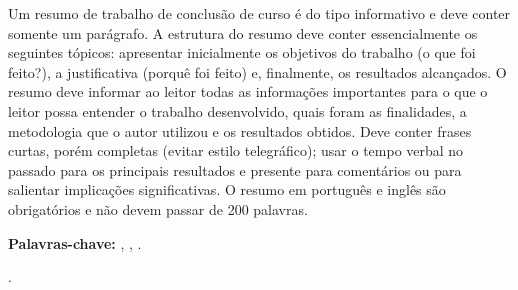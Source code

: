 
Um resumo de trabalho de conclusão de curso é do tipo informativo e deve conter somente um parágrafo. A estrutura do resumo deve conter essencialmente os seguintes tópicos: apresentar inicialmente os objetivos do trabalho (o que foi feito?), a justificativa (porquê foi feito) e, finalmente, os resultados alcançados. O resumo deve informar ao leitor todas as informações importantes para o que o leitor possa entender o trabalho desenvolvido, quais foram as finalidades, a metodologia que o autor utilizou e os resultados obtidos. Deve conter frases curtas, porém completas (evitar estilo telegráfico); usar o tempo verbal no passado para os principais resultados e presente para comentários ou para salientar implicações significativas.  O resumo em português e inglês são obrigatórios e não devem passar de 200 palavras.

\textbf{ Palavras-chave:} ,  , .

.


